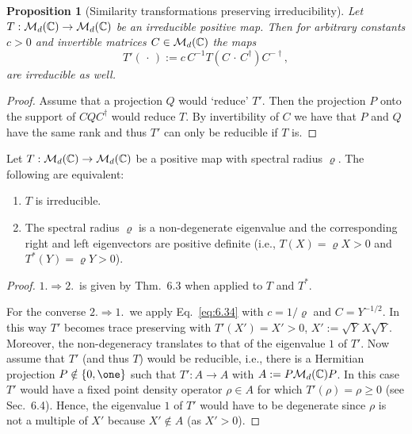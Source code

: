 \documentclass[11pt,a4paper]{article}
\theoremstyle{plain}
\newtheorem{proposition}{Proposition}[section]
\theoremstyle{definition}
\theoremstyle{remark}
\begin{document}
\begin{proposition}[Similarity transformations preserving irreducibility]
    Let $T:\mathcal{M}_d(\mathbb{C})\to\mathcal{M}_d(\mathbb{C})$ be an irreducible positive map. Then for arbitrary
    constants $c>0$ and invertible matrices $C\in\mathcal{M}_d(\mathbb{C})$ the maps
    \begin{equation}\tag{6.34}\label{eq:6.34}
        T'(\,\cdot\,) := c\,C^{-1}T(C\,\cdot\, C^\dagger)C^{-\dagger},
    \end{equation}
    are irreducible as well.
\end{proposition}

\begin{proof}
    Assume that a projection $Q$ would `reduce' $T'$. Then the projection $P$ onto the
    support of $CQC^\dagger$ would reduce $T$. By invertibility of $C$ we have that $P$
    and $Q$ have the same rank and thus $T'$ can only be reducible if $T$ is.
\end{proof}

\begin{theorem}
    Let $T:\mathcal{M}_d(\mathbb{C})\to\mathcal{M}_d(\mathbb{C})$ be a positive map with spectral radius $\varrho$.
    The following are equivalent:
    \begin{enumerate}
        \item $T$ is irreducible.
        \item The spectral radius $\varrho$ is a non-degenerate eigenvalue and the corresponding
              right and left eigenvectors are positive definite (i.e., $T(X)=\varrho X>0$ and
              $T^*(Y)=\varrho Y>0$).
    \end{enumerate}
\end{theorem}

\begin{proof}
    $1.\Rightarrow 2$.\ is given by Thm.~6.3 when applied to $T$ and $T^*$.

    For the converse $2.\Rightarrow 1$.\ we apply Eq.~\eqref{eq:6.34} with $c=1/\varrho$
    and $C=Y^{-1/2}$. In this way $T'$ becomes trace preserving with $T'(X')=X'>0$,
    $X':=\sqrt{Y}\,X\sqrt{Y}$. Moreover, the non-degeneracy translates to that of the
    eigenvalue $1$ of $T'$. Now assume that $T'$ (and thus $T$) would be reducible, i.e.,
    there is a Hermitian projection $P\notin\{0,\one\}$ such that $T':A\to A$ with
    $A:=P\mathcal{M}_d(\mathbb{C})P$. In this case $T'$ would have a fixed point density operator
    $\rho\in A$ for which $T'(\rho)=\rho\ge 0$ (see Sec.~6.4). Hence, the eigenvalue $1$
    of $T'$ would have to be degenerate since $\rho$ is not a multiple of $X'$ because
    $X'\notin A$ (as $X'>0$).
\end{proof}
\end{document}
